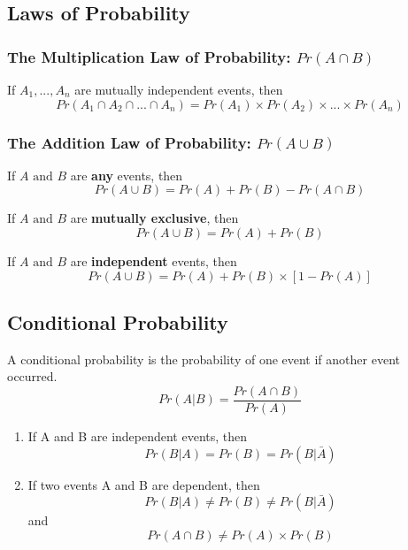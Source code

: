 \documentclass[12pt,]{article}
\providecommand{\tightlist}{%
  \setlength{\itemsep}{0pt}\setlength{\parskip}{0pt}}
\begin{document}
\hypertarget{laws-of-probability}{%
\subsection{Laws of Probability}\label{laws-of-probability}}

\hypertarget{the-multiplication-law-of-probability-pracap-b}{%
\subsubsection{\texorpdfstring{The Multiplication Law of Probability:
\(Pr(A\cap B)\)}{The Multiplication Law of Probability: Pr(A\textbackslash{}cap B)}}\label{the-multiplication-law-of-probability-pracap-b}}

If \(A_1,...,A_n\) are mutually independent events, then
\[Pr(A_1 \cap A_2 \cap ... \cap A_n) = Pr(A_1)\times Pr(A_2)\times ...\times Pr(A_n)\]

\hypertarget{the-addition-law-of-probability-pracup-b}{%
\subsubsection{\texorpdfstring{The Addition Law of Probability:
\(Pr(A\cup B)\)}{The Addition Law of Probability: Pr(A\textbackslash{}cup B)}}\label{the-addition-law-of-probability-pracup-b}}

If \(A\text{ and }B\) are \textbf{any} events, then
\[Pr(A \cup B) = Pr(A)+ Pr(B)- Pr(A\cap B)\]

If \(A\text{ and }B\) are \textbf{mutually exclusive}, then
\[Pr(A \cup B) = Pr(A)+ Pr(B)\]

If \(A\text{ and }B\) are \textbf{independent} events, then
\[Pr(A \cup B) = Pr(A)+ Pr(B)\times[1-Pr(A)]\]

\hypertarget{conditional-probability}{%
\subsection{Conditional Probability}\label{conditional-probability}}

A conditional probability is the probability of one event if another
event occurred. \[Pr(A|B) = \frac{Pr(A\cap B)}{Pr(A)}\]

\begin{enumerate}
\def\labelenumi{\arabic{enumi}.}
\tightlist
\item
  If A and B are independent events, then
  \[Pr(B|A) = Pr(B) = Pr(B|\bar{A})\]
\item
  If two events A and B are dependent, then
  \[Pr(B|A)\ne Pr(B) \ne Pr(B|\bar{A})\] and
  \[Pr(A\cap B) \ne Pr(A)\times Pr(B)\]
\end{enumerate}
\end{document}

